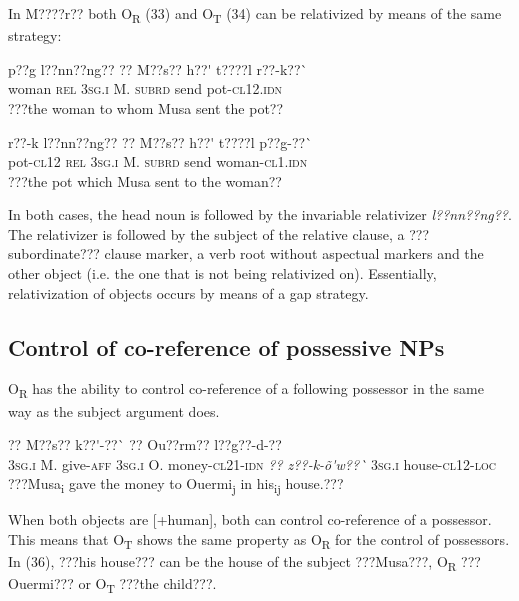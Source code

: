 \documentclass[output=paper]{langsci/langscibook}
\begin{document}

In M????r?? both O\textsubscript{R} (33) and O\textsubscript{T} (34) can be relativized by means of the same strategy:


\ea \gll 
\label{bkm:Ref424233046}p??g    l??nn??ng??  ??    M??s??  h??\'{ }    t????l  r??-k??\`{ }
\\
%
woman  \textsc{rel}    \textsc{3sg.i  }  M.  \textsc{subrd}    send  pot-\textsc{cl12.idn}
\\\glt
???the woman to whom Musa sent the pot??
\z


\ea \gll 
\label{bkm:Ref424233055}r??-k    l??nn??ng??  ??    M??s??  h??\'{ }    t????l  p??g-??\`{ }
\\
%
pot-\textsc{cl12}  \textsc{rel}    \textsc{3sg.i  }  M.  \textsc{subrd}    send  woman-\textsc{cl1.idn}
\\\glt
???the pot which Musa sent to the woman??
\z

In both cases, the head noun is followed by the invariable relativizer \textit{l??nn??ng??}. The relativizer is followed by the subject of the relative clause, a ???subordinate??? clause marker, a verb root without aspectual markers and the other object (i.e. the one that is not being relativized on). Essentially, relativization of objects occurs by means of a gap strategy. 

\subsection{Control of co{}-reference of possessive NPs}

O\textsubscript{R} has the ability to control co-reference of a following possessor{ }in the same way as the subject argument does.


\ea \gll 
??    M??s??  k??\'{ }-??\`{ }  ??    Ou??rm??  l??g??-d-??    
\\
%
\textsc{3sg.i}  M.  give-\textsc{aff  3sg.i}    O.            money-\textsc{cl21-idn}     \textit{??    z??-k-\~{o}\'{ }w??\`{ }}  
%
  \textsc{3sg.i  }  house-\textsc{cl12-loc}
\\\glt
???Musa\textsubscript{i} gave the money to Ouermi\textsubscript{j} in his\textsubscript{ij} house.???
\z

When both objects are [+human], both can control co-reference of a possessor. This means that O\textsubscript{T }shows the same property as O\textsubscript{R} for the control of possessors. In (36), ???his house??? can be the house of the subject ???Musa???, O\textsubscript{R} ???Ouermi??? or O\textsubscript{T} ???the child???.
\end{document}
